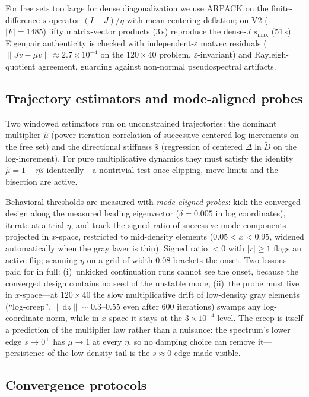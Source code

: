 \documentclass[11pt,a4paper]{article}
\newcommand{\smax}{s_{\max}}
\newcommand{\Dfilt}{\tilde{D}}
\begin{document}
For free sets too large for dense diagonalization we use ARPACK on the
finite-difference $s$-operator $(I-J)/\eta$ with mean-centering deflation;
on V2 ($|F|=1485$) fifty matrix-vector products (3\,s) reproduce the
dense-$J$ $\smax$ (51\,s). Eigenpair authenticity is checked with
independent-$\varepsilon$ matvec residuals ($\|Jv-\mu v\|\approx
2.7\times10^{-4}$ on the $120{\times}40$ problem, $\varepsilon$-invariant)
and Rayleigh-quotient agreement, guarding against non-normal
pseudospectral artifacts.

\subsection{Trajectory estimators and mode-aligned probes}
\label{sec:probes}

Two windowed estimators run on unconstrained trajectories: the dominant
multiplier $\hat\mu$ (power-iteration correlation of successive centered
log-increments on the free set) and the directional stiffness $\hat s$
(regression of centered $\Delta\ln\Dfilt$ on the log-increment). For pure
multiplicative dynamics they must satisfy the identity
$\hat\mu=1-\eta\hat s$ identically---a nontrivial test once clipping, move
limits and the bisection are active.

Behavioral thresholds are measured with \emph{mode-aligned probes}: kick
the converged design along the measured leading eigenvector
($\delta=0.005$ in log coordinates), iterate at a trial $\eta$, and track
the signed ratio of successive mode components projected in $x$-space,
restricted to mid-density elements ($0.05<x<0.95$, widened automatically
when the gray layer is thin). Signed ratio $<0$ with $|r|\ge1$ flags an
active flip; scanning $\eta$ on a grid of width $0.08$ brackets the onset.
Two lessons paid for in full: (i)~unkicked continuation runs cannot see
the onset, because the converged design contains no seed of the unstable
mode; (ii)~the probe must live in $x$-space---at $120\times40$ the slow
multiplicative drift of low-density gray elements (``log-creep'',
$\|\mathrm{d}z\|\sim0.3$--$0.55$ even after 600 iterations) swamps any
log-coordinate norm, while in $x$-space it stays at the $3\times10^{-4}$
level. The creep is itself a prediction of the multiplier law rather than
a nuisance: the spectrum's lower edge $s\to0^{+}$ has $\mu\to1$ at every
$\eta$, so no damping choice can remove it---persistence of the
low-density tail is the $s\approx0$ edge made visible.

\subsection{Convergence protocols}\label{sec:protocols}
\end{document}

